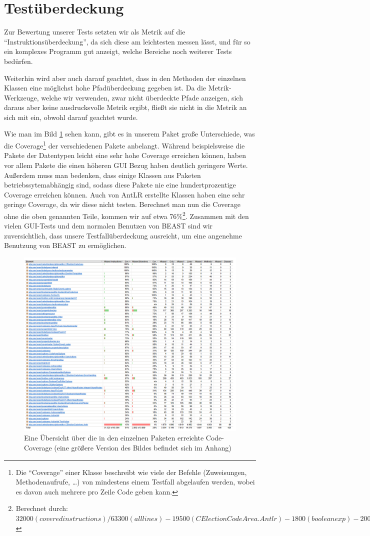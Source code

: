 \documentclass[a4paper]{scrreprt}
\begin{document}
\section{Testüberdeckung}
Zur Bewertung unserer Tests setzten wir als Metrik auf die
"`Instruktionsüberdeckung"', da sich diese am leichtesten messen lässt, und für
so ein komplexes Programm gut anzeigt, welche Bereiche noch weiterer Tests
bedürfen.

Weiterhin wird aber auch darauf geachtet, dass in den Methoden der einzelnen Klassen eine möglichst hohe
Pfadüberdeckung gegeben ist. Da die Metrik-Werkzeuge, welche wir verwenden, zwar
nicht überdeckte Pfade anzeigen, sich daraus aber keine ausdrucksvolle Metrik ergibt, fließt sie nicht in die Metrik an sich mit ein, obwohl darauf
geachtet wurde.
\newline

Wie man im Bild \ref{coverage} sehen kann, gibt es in unserem Paket große
Unterschiede, was die Coverage\footnote{Die "`Coverage"' einer Klasse beschreibt
wie viele der Befehle (Zuweisungen, Methodenaufrufe, \ldots ) von mindestens einem
Testfall abgelaufen werden, wobei es davon auch mehrere pro Zeile Code geben kann.} der verschiedenen Pakete anbelangt.
Während beispielsweise die Pakete der Datentypen leicht eine sehr hohe Coverage
erreichen können, haben vor allem Pakete die einen höheren GUI Bezug haben
deutlich geringere Werte. \\
Außerdem muss man bedenken, dass einige Klassen aus Paketen
betriebssytemabhängig sind, sodass diese Pakete nie eine hundertprozentige Coverage
erreichen können. Auch von AntLR erstellte Klassen haben eine sehr geringe
Coverage, da wir diese nicht testen.
\newline
Berechnet man nun die Coverage ohne die oben genannten Teile, kommen wir auf etwa
76\%\footnote{Berechnet durch: $32000 (covered instructions) / 63300 (all
lines) - 19500 (CElectionCodeArea.Antlr) - 1800 (booleanexp) - 200
(LinuxProcess)$}.
Zusammen mit den vielen GUI-Tests und dem normalen Benutzen von BEAST sind
wir zuversichtlich, dass unsere Testfallüberdeckung ausreicht, um eine
angenehme Benutzung von BEAST zu ermöglichen.

\begin{figure}[ht]
	\centering
  \includegraphics[width=1.0\textwidth,
  height=0.40\textwidth]{images/Coverage.png} \caption{Eine Übersicht über die
  in den einzelnen Paketen erreichte Code-Coverage (eine größere Version des
  Bildes befindet sich im Anhang)}
	\label{coverage}
\end{figure}
\end{document}
